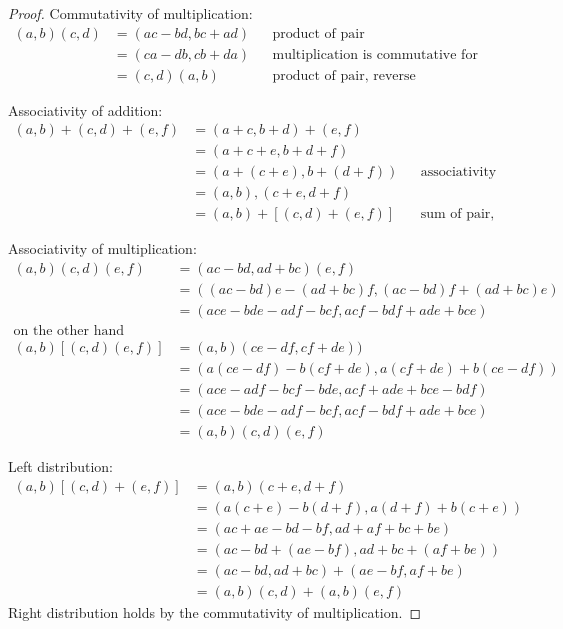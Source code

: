 \documentclass[b5paper]{article}
\begin{document}
\begin{Answer}[ref={ex:complex}]
{\begin{proof}
Commutativity of multiplication:
\begin{align*}
(a, b)(c, d) &= (ac - bd, bc + ad) && \text{product of pair} \\
  &= (ca - db, cb + da) && \text{multiplication is commutative for normal numbers} \\
  &= (c, d)(a, b) && \text{product of pair, reverse}
\end{align*}

Associativity of addition:
\begin{align*}
(a, b) + (c, d) + (e, f) &= (a + c, b + d) + (e, f) \\
  &= (a + c + e, b + d + f) \\
  &= (a + (c + e), b + (d + f)) && \text{associativity for normal numbers} \\
  &= (a, b), (c + e, d + f) \\
  &= (a, b) + [(c, d) + (e, f)] && \text{sum of pair, reverse}
\end{align*}

Associativity of multiplication:
\begin{align*}
(a, b)(c, d)(e, f) &= (ac - bd, ad + bc)(e, f) \\
  &= ((ac - bd)e - (ad + bc)f, (ac - bd)f + (ad + bc)e) \\
  &= (ace - bde - adf - bcf, acf - bdf + ade + bce) \\
\text{on the other hand} \\
(a, b)[(c, d)(e, f)] &= (a, b)(ce - df, cf + de)) \\
  &= (a(ce - df) - b(cf + de), a(cf + de) + b(ce - df)) \\
  &= (ace - adf - bcf - bde, acf + ade + bce - bdf) \\
  &= (ace - bde - adf - bcf, acf - bdf + ade + bce) \\
  &= (a, b)(c, d)(e, f)
\end{align*}

Left distribution:
\begin{align*}
(a, b)[(c, d) + (e, f)] &= (a, b)(c + e, d + f) \\
  &= (a(c + e) - b(d + f), a(d + f) + b(c + e)) \\
  &= (ac + ae - bd - bf, ad + af + bc + be) \\
  &= (ac - bd + (ae - bf), ad + bc + (af + be)) \\
  &= (ac - bd, ad + bc) + (ae - bf, af + be) \\
  &= (a, b)(c, d) + (a, b)(e, f)
\end{align*}
Right distribution holds by the commutativity of multiplication.
\end{proof}
}


\end{Answer}
\end{document}
